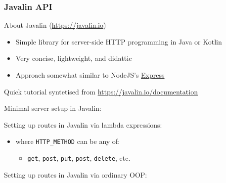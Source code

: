 \documentclass[presentation]{beamer}\mode<presentation>{\usetheme{AMSBolognaFC}}
\begin{document}
\begin{frame}[allowframebreaks]
    \frametitle{Javalin API}

    \begin{block}{About Javalin (\url{https://javalin.io})}
        \begin{itemize}
            \item Simple library for server-side HTTP programming in Java or Kotlin
            \item Very concise, lightweight, and \alert{didattic}
            \item Approach somewhat similar to NodeJS's \href{https://expressjs.com/it/}{Express}
        \end{itemize}
    \end{block}

    \begin{alertblock}{Quick tutorial syntetised from}
        \url{https://javalin.io/documentation}
    \end{alertblock}

    \framebreak

    Minimal server setup in Javalin:
    

    \framebreak

    Setting up routes in Javalin via lambda expressions:
    

    \begin{itemize}
        \item where \texttt{HTTP\_METHOD} can be any of:
        \begin{itemize}
            \item[] \texttt{get}, \texttt{post}, \texttt{put}, \texttt{post}, \texttt{delete}, etc.
        \end{itemize}
    \end{itemize}

    \framebreak

    Setting up routes in Javalin via ordinary OOP:
    

    \framebreak


\end{frame}
\end{document}
